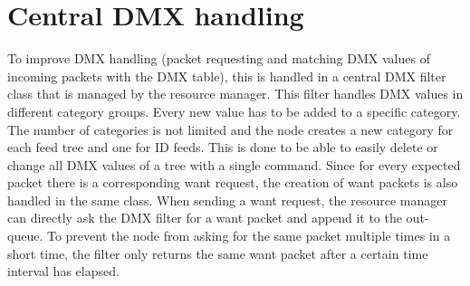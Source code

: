 \section{Central DMX handling}
To improve DMX handling (packet requesting and matching DMX values of incoming packets with the DMX table), this is handled in a central DMX filter class that is managed by the resource manager. This filter handles DMX values in different category groups. Every new value has to be added to a specific category. The number of categories is not limited and the node creates a new category for each feed tree and one for ID feeds. This is done to be able to easily delete or change all DMX values of a tree with a single command. Since for every expected packet there is a corresponding want request, the creation of want packets is also handled in the same class. When sending a want request, the resource manager can directly ask the DMX filter for a want packet and append it to the out-queue. To prevent the node from asking for the same packet multiple times in a short time, the filter only returns the same want packet after a certain time interval has elapsed.